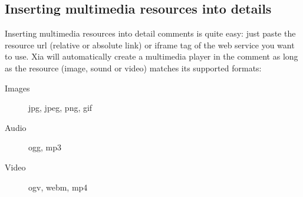 

\subsection{Inserting multimedia resources into details}\label{enrichissement_multimedia}

Inserting multimedia resources into detail comments is quite easy: just paste 
the resource url (relative or absolute link) or iframe tag of the web service 
you want to use. Xia will automatically create a multimedia player in the comment as long as 
the resource (image, sound or video) matches its supported formats: 
\begin{description}
 \item [Images] jpg, jpeg, png, gif
 \item [Audio] ogg, mp3
 \item [Video] ogv, webm, mp4
\end{description}

